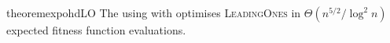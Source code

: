 %
%
%
%


\begin{restatable}{theorem}{expohdLO}\label{thm:expohdLO}
The {\oneoneIA } using \IPHfcm{} with {\expoHD } optimises
\textsc{LeadingOnes} in $\Theta(n^{5/2}/\log^2 n)$ expected fitness function
evaluations.
\end{restatable}

